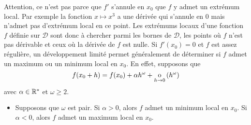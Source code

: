 \documentclass{magnolia}
\begin{document}
\begin{remarques}
\remarque Attention, ce n'est pas parce que $f'$ s'annule en $x_0$ que $f$
  y admet un extrémum local. Par exemple la fonction $x\mapsto x^3$
  a une dérivée qui s'annule en 0 mais n'admet pas d'extrémum local en ce point.
\remarque Les extrémums locaux d'une fonction $f$ définie sur $\mathcal{D}$ sont
  donc à chercher parmi les bornes de $\mathcal{D}$, les points où $f$ n'est
  pas dérivable et ceux où la dérivée de $f$ est nulle.
\remarque Si $f'(x_0)=0$ et $f$ est assez régulière, un développement limité permet généralement de déterminer
  si $f$ admet un maximum ou un minimum local en $x_0$. En effet, supposons que
  \[f(x_0+h)=f(x_0)+\alpha h^\omega+\petitozero{h}{h^\omega}\]
  avec $\alpha\in\Rs$ et $\omega\geq 2$.
  \begin{itemize}
  \item Supposons que $\omega$ est pair. Si $\alpha>0$, alors $f$ admet un minimum local en $x_0$. Si $\alpha<0$, alors $f$ admet un maximum local en $x_0$.
\medskip
{}
\begin{center}
\begin{figure}[H]
\begin{center}
$\qquad$
\begin{tikzpicture}[>=latex,scale=1.0]

\end{tikzpicture}
\end{center}
\end{figure}
\end{center}
\end{itemize}
\end{remarques}
\end{document}
